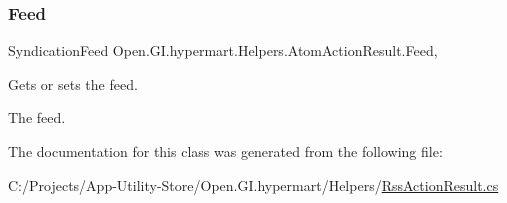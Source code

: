 \subsubsection{\texorpdfstring{Feed}{Feed}}
{\footnotesize\ttfamily Syndication\+Feed Open.\+G\+I.\+hypermart.\+Helpers.\+Atom\+Action\+Result.\+Feed\hspace{0.3cm}{\ttfamily [get]}, {\ttfamily [set]}}



Gets or sets the feed. 

The feed. 

The documentation for this class was generated from the following file\+:\begin{DoxyCompactItemize}
\item 
C\+:/\+Projects/\+App-\/\+Utility-\/\+Store/\+Open.\+G\+I.\+hypermart/\+Helpers/\hyperlink{_rss_action_result_8cs}{Rss\+Action\+Result.\+cs}\end{DoxyCompactItemize}
